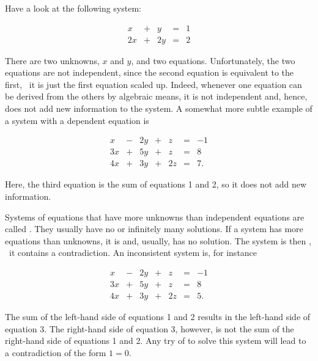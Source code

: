 \documentclass[tikz]{scrreprt}
\begin{document}
Have a look at the following system: 

\begin{equation}
\begin{array}{rcrcr}
 x & + &  y & = & 1\\
2x & + & 2y & = & 2
\end{array}
\end{equation}

There are two unknowns, $x$ and $y$, and two equations.
Unfortunately, the two equations are not independent,
since the second equation is equivalent to the first,
\ie\ it is just the first equation scaled up.
Indeed, whenever one equation can be derived from the others
by algebraic means, it is not independent and, hence,
does not add new information to the system.
A somewhat more subtle example of a system 
with a dependent equation is

\begin{equation}\label{eq_linEqUnder}
\begin{array}{rcrcrcr}
 x & - & 2y & + &  z & = & -1\\
3x & + & 5y & + &  z & = &  8\\
4x & + & 3y & + & 2z & = &  7.
\end{array}
\end{equation}

Here, the third equation is the sum of equations 1 and 2,
so it does not add new information.

Systems of equations that have more unknowns than
independent equations are called .
They usually have no or infinitely many solutions.
If a system has more equations than unknowns, it is
 and, usually, has no solution.
The system is then , \ie\ it contains a
contradiction. An inconsistent system is, for instance

\begin{equation}
\begin{array}{rcrcrcr}
 x & - & 2y & + &  z & = & -1\\
3x & + & 5y & + &  z & = &  8\\
4x & + & 3y & + & 2z & = &  5.
\end{array}
\end{equation}

The sum of the left-hand side of equations 1 and 2 results in
the left-hand side of equation 3. 
The right-hand side of equation 3, however,
is not the sum of the right-hand side of equations 1 and 2.
Any try of to solve this system will lead to 
a contradiction of the form $1=0$.
\end{document}
